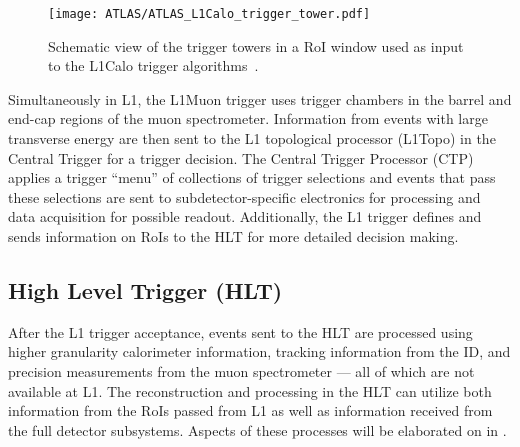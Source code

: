 \begin{figure}[htbp]
 \centering
 \texttt{[image: ATLAS/ATLAS\_L1Calo\_trigger\_tower.pdf]}
 \caption[Schematic view of the trigger towers in a region of interest window used as input to the L1Calo trigger algorithms.]{%
  Schematic view of the trigger towers in a RoI window used as input to the L1Calo trigger algorithms~\cite{TRIG-2016-01}.}\label{fig:ATLAS_L1Calo_trigger_tower}
\end{figure}

Simultaneously in L1, the L1Muon trigger uses trigger chambers in the barrel and end-cap regions of the muon spectrometer.
Information from events with large transverse energy are then sent to the L1 topological processor (L1Topo) in the Central Trigger for a trigger decision.
The Central Trigger Processor (CTP) applies a trigger ``menu'' of collections of trigger selections and events that pass these selections are sent to subdetector-specific electronics for processing and data acquisition for possible readout.
Additionally, the L1 trigger defines and sends information on RoIs to the HLT for more detailed decision making.

\subsection{High Level Trigger (HLT)}\label{sec:ATLAS_HLT}

After the L1 trigger acceptance, events sent to the HLT are processed using higher granularity calorimeter information, tracking information from the ID, and precision measurements from the muon spectrometer --- all of which are not available at L1.
The reconstruction and processing in the HLT can utilize both information from the RoIs passed from L1 as well as information received from the full detector subsystems.
Aspects of these processes will be elaborated on in .
